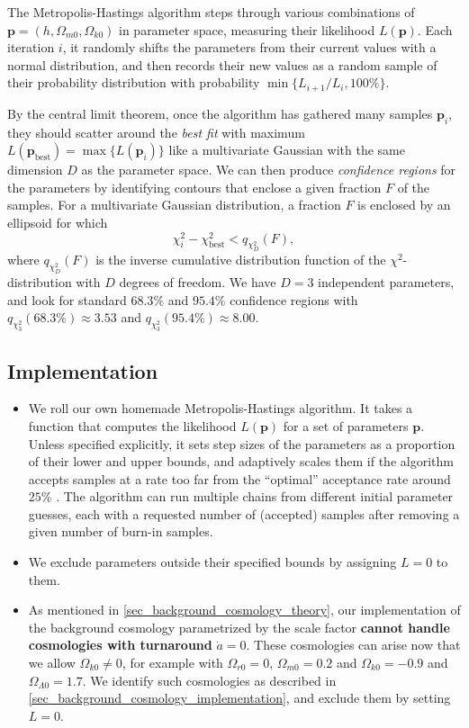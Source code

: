 \documentclass[10pt,a4paper]{article}
\begin{document}
The Metropolis-Hastings algorithm steps through various combinations of $\mathbf{p} = (h,\Omega_{m0},\Omega_{k0})$ in parameter space, measuring their likelihood $L(\mathbf{p})$.
Each iteration $i$, it randomly shifts the parameters from their current values with a normal distribution,
and then records their new values as a random sample of their probability distribution with probability $\min\big\{L_{i+1}/L_i, 100\%\big\}$.

By the central limit theorem, once the algorithm has gathered many samples $\mathbf{p}_i$,
they should scatter around the \emph{best fit}
with maximum $L(\mathbf{p}_\text{best}) = \max\{L(\mathbf{p}_i)\}$
like a multivariate Gaussian with the same dimension $D$ as the parameter space.
We can then produce \emph{confidence regions} for the parameters
by identifying contours that enclose a given fraction $F$ of the samples.
For a multivariate Gaussian distribution, a fraction $F$ is enclosed by an ellipsoid
for which
\begin{equation}
	\chi^2_i - \chi^2_\text{best} < q_{\chi^2_D}(F),
\label{eq_confidence_region}
\end{equation}
where $q_{\chi^2_D}(F)$ is the inverse cumulative distribution function of the $\chi^2$-distribution with $D$ degrees of freedom.
We have $D=3$ independent parameters, and look for standard $68.3\%$ and $95.4\%$ confidence regions
with $q_{\chi^2_3}(68.3\%) \approx 3.53$ and $q_{\chi^2_3}(95.4\%) \approx 8.00$.

\subsection{Implementation}

\begin{itemize}
	\item We roll our own homemade Metropolis-Hastings algorithm.
	      It takes a function that computes the likelihood $L(\mathbf{p})$ for a set of parameters $\mathbf{p}$.
	      Unless specified explicitly, it sets step sizes of the parameters as a proportion of their lower and upper bounds,
		  and adaptively scales them if the algorithm accepts samples at a rate too far from the ``optimal'' acceptance rate around $25\%$ \cite{gelmanWeakConvergenceOptimal1997}.
		  The algorithm can run multiple chains from different initial parameter guesses,
		  each with a requested number of (accepted) samples after removing a given number of burn-in samples.
	\item We exclude parameters outside their specified bounds by assigning $L=0$ to them.
	\item As mentioned in \cref{sec_background_cosmology_theory},
	      our implementation of the background cosmology parametrized by the scale factor
	      \textbf{cannot handle cosmologies with turnaround} $\dot{a} = 0$.
	      These cosmologies can arise now that we allow $\Omega_{k0} \neq 0$,
	      for example with $\Omega_{r0}=0$, $\Omega_{m0} = 0.2$ and $\Omega_{k0} = -0.9$ and $\Omega_{\Lambda0} = 1.7$.
	      We identify such cosmologies as described in \cref{sec_background_cosmology_implementation}, and exclude them by setting $L=0$.
\end{itemize}
\end{document}
